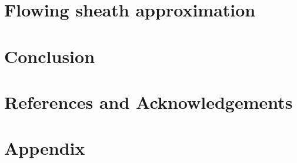 \documentclass{article}
\begin{document}
\section{Flowing sheath approximation}
\section{Conclusion}


\section{References and Acknowledgements}



\section{Appendix}
\end{document}
